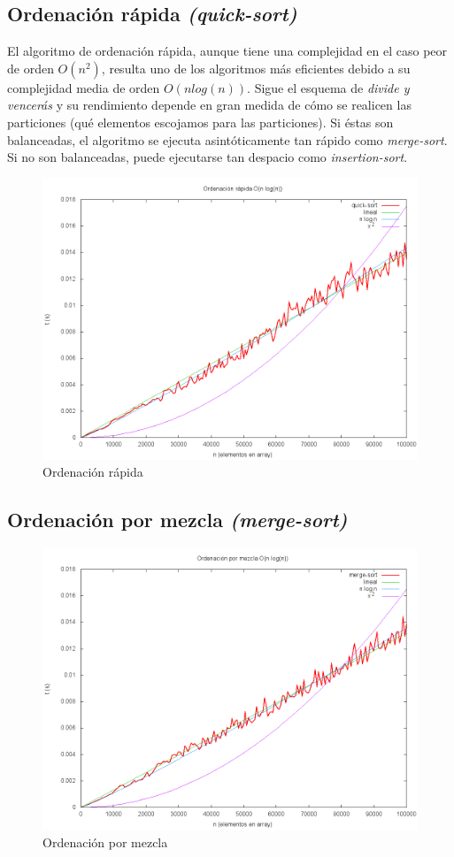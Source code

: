 \subsection{Ordenación rápida \textit{(quick-sort)}}
El algoritmo de ordenación rápida, aunque tiene una complejidad en el caso peor de orden $O(n^2)$, resulta uno de los algoritmos más eficientes debido a su complejidad media de orden $O(nlog(n))$.  Sigue el esquema de \textit{divide y vencerás} y su rendimiento depende en gran medida de cómo se realicen las particiones (qué elementos escojamos para las particiones).  Si éstas son balanceadas, el algoritmo se ejecuta asintóticamente tan rápido como \textit{merge-sort}.  Si no son balanceadas, puede ejecutarse tan despacio como \textit{insertion-sort}.\cite{CORMEN}
	\begin{figure}[H]
  		\centering
   	 	\includegraphics[width=1.0\textwidth]{quick-sort.png}
  		\caption{Ordenación rápida}
  		\label{fig:quick}
	\end{figure}
	
\subsection{Ordenación por mezcla \textit{(merge-sort)}}

	\begin{figure}[H]
  		\centering
   	 	\includegraphics[width=1.0\textwidth]{merge-sort.png}
  		\caption{Ordenación por mezcla}
  		\label{fig:merge}
	\end{figure}
